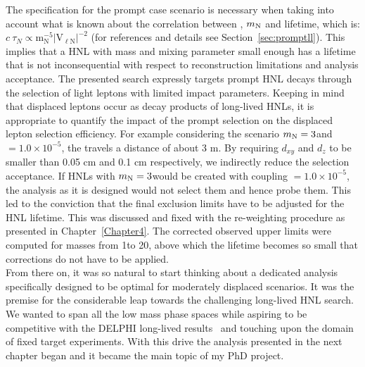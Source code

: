 The specification for the prompt case scenario is necessary when taking
into account what is known about the correlation between \mixpar, $
m_\mathrm{N} $ and \hnl lifetime, which is: $c\:\tau_{N}
\propto\mathrm{m_{N}^{-5}|V_{\ell N}|^{-2}}$ (for references and
details see Section~\ref{sec:promptll}). This implies that a HNL with
mass and mixing parameter small enough has a lifetime that
is not inconsequential with respect to reconstruction limitations and 
analysis acceptance. The presented search expressly targets prompt
HNL decays through the selection of light leptons with 
limited impact parameters. Keeping in mind that displaced leptons occur as decay
products of long-lived HNLs, it is appropriate to quantify the impact of the
prompt selection on the displaced lepton selection
efficiency. For example considering the scenario $m_\mathrm{N} = 3$\GeV and 
\mixparm $= 1.0\times 10^{-5}$, the \hnl travels a distance
of about 3 m. By requiring $d_{xy}$ and $d_z$ to
be smaller than 0.05 cm and 0.1 cm respectively, we indirectly reduce
the selection acceptance. If HNLs with $m_\mathrm{N} = 3$\GeV would be created with
coupling \mixparm $= 1.0\times 10^{-5}$, the analysis as it is
designed would not select them and hence probe them. This led to the conviction that the final
exclusion limits have to be adjusted for the HNL lifetime. This was
discussed and fixed with the re-weighting procedure as presented in
Chapter~\ref{Chapter4}. The corrected observed upper limits were
computed for masses from 1\GeV to 20\GeV, above which the lifetime
becomes so small that corrections do not have to be applied.\\
From there on, it was so natural to start thinking about a dedicated
analysis specifically designed to be optimal for moderately displaced scenarios. It
was the premise for the considerable leap towards the
challenging long-lived HNL search. We wanted to span all the
low mass phase spaces while aspiring to be competitive with the DELPHI
long-lived results~\cite{Abreu:1996pa} and touching upon the domain of
fixed target experiments. With this drive the analysis presented in
the next chapter began and it became the main topic of my PhD
project.\\

